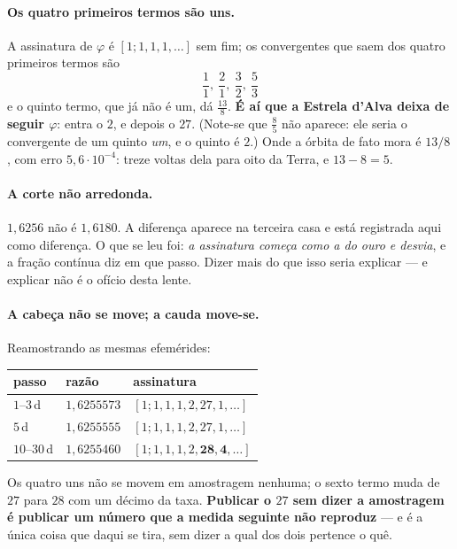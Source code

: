 \documentclass[11pt]{article}
\theoremstyle{plain}
\theoremstyle{remark}
\begin{document}
\paragraph{Os quatro primeiros termos são uns.} A assinatura de $\varphi$ é
$[1;1,1,1,\dots]$ sem fim; os convergentes que saem dos quatro primeiros termos são
\[
\frac11,\ \frac21,\ \frac32,\ \frac53
\]
e o quinto termo, que já não é um, dá $\frac{13}{8}$. \textbf{É aí que a
Estrela d'Alva deixa de seguir $\varphi$}: entra o $2$, e depois o $27$.
(Note-se que $\frac85$ não aparece: ele seria o convergente de um quinto
\emph{um}, e o quinto é $2$.) Onde a órbita de fato mora é $13/8$,
com erro $5{,}6\cdot10^{-4}$: treze voltas dela para oito da Terra, e
$13-8=5$.

\paragraph{A corte não arredonda.} $1{,}6256$ não é $1{,}6180$. A diferença
aparece na terceira casa e está registrada aqui como diferença. O que se leu
foi: \emph{a assinatura começa como a do ouro e desvia}, e a fração contínua
diz em que passo. Dizer mais do que isso seria explicar --- e explicar não é o
ofício desta lente.

\paragraph{A cabeça não se move; a cauda move-se.} Reamostrando as mesmas
efemérides:

\begin{center}
\begin{tabular}{@{}lll@{}}
\toprule
passo & razão & assinatura \\
\midrule
$1$--$3$\,d & $1{,}6255573$ & $[1;1,1,1,2,27,1,\dots]$ \\
$5$\,d & $1{,}6255555$ & $[1;1,1,1,2,27,1,\dots]$ \\
$10$--$30$\,d & $1{,}6255460$ & $[1;1,1,1,2,\mathbf{28},\mathbf{4},\dots]$ \\
\bottomrule
\end{tabular}
\end{center}

\noindent Os quatro uns não se movem em amostragem nenhuma; o sexto termo muda
de $27$ para $28$ com um décimo da taxa. \textbf{Publicar o $27$ sem dizer a
amostragem é publicar um número que a medida seguinte não reproduz} --- e é a
única coisa que daqui se tira, sem dizer a qual dos dois pertence o quê.
\end{document}
